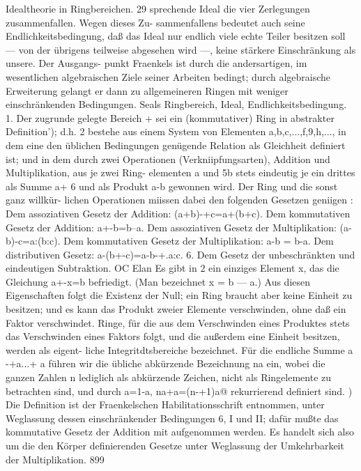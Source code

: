 \documentclass[11pt,a4paper]{article}
\theoremstyle{plain}
\theoremstyle{definition}
\begin{document}
Idealtheorie in Ringbereichen. 
29 
sprechende Ideal die vier Zerlegungen zusammenfallen. 
Wegen dieses Zu- 
sammenfallens bedeutet auch seine Endlichkeitsbedingung, daß das Ideal 
nur endlich viele echte Teiler besitzen soll --- 
von der übrigens teilweise 
abgesehen wird ---, keine stärkere Einschränkung als unsere. 
Der Ausgangs- 
punkt Fraenkels ist durch die andersartigen, im wesentlichen algebraischen 
Ziele seiner Arbeiten bedingt; durch algebraische Erweiterung gelangt er 
dann zu allgemeineren Ringen mit weniger einschränkenden Bedingungen. 
Seals 
Ringbereich, Ideal, Endlichkeitsbedingung. 
1. Der zugrunde gelegte Bereich + sei ein (kommutativer) Ring in 
abstrakter Definition'); d.h. 2 bestehe aus einem System von Elementen 
a,b,c,...,f,9,h,..., 
in dem eine den üblichen Bedingungen genügende 
Relation als Gleichheit definiert ist; und in dem durch zwei Operationen 
(Verkniipfungsarten), 
Addition 
und Multiplikation, 
aus 
je zwei Ring- 
elementen a und 5b stets eindeutig je ein drittes 
als Summe a+ 6 und 
als Produkt a-b gewonnen wird. 
Der Ring und die sonst ganz willkür- 
lichen Operationen miissen dabei den folgenden Gesetzen geniigen : 
Dem assoziativen Gesetz der Addition: (a+b)-+c=a+(b+c). 
Dem kommutativen Gesetz der Addition: 
a+-b=b--a. 
Dem assoziativen Gesetz der Multiplikation: 
(a-b)-c=a:(b:c). 
Dem kommutativen Gesetz der Multiplikation: a-b = b-a. 
Dem distributiven Gesetz: a-(b+-c)=a-b-+.a:c. 
6. Dem Gesetz der unbeschränkten und eindeutigen Subtraktion. 
OC 
Elan 
Es gibt in 2 ein einziges Element 
x, 
das die 
Gleichung a+-x=b 
befriedigt. 
(Man bezeichnet x = b --- a.) 
Aus diesen Eigenschaften 
folgt die Existenz 
der Null; 
ein Ring 
braucht aber keine Einheit zu besitzen; und es kann das Produkt zweier 
Elemente verschwinden, 
ohne daß 
ein Faktor verschwindet. 
Ringe, 
für 
die aus dem Verschwinden eines Produktes 
stets das Verschwinden eines 
Faktors folgt, und die außerdem eine Einheit besitzen, werden als eigent- 
liche Integritdtsbereiche bezeichnet. 
Für die endliche Summe a -+a...+ a 
führen wir die übliche abkürzende Bezeichnung na ein, wobei die ganzen 
Zahlen n lediglich 
als abkürzende Zeichen, 
nicht 
als Ringelemente 
zu 
betrachten 
sind, und durch 
a=1-a, na+a=(n-+1)a@ 
rekurrierend 
definiert sind. 
\textdegree{}) Die Definition 
ist der Fraenkelschen Habilitationsschrift entnommen, 
unter 
Weglassung 
dessen einschränkender 
Bedingungen 
6, I und 
II; dafür mußte 
das 
kommutative Gesetz der Addition 
mit aufgenommen werden. 
Es handelt 
sich also 
um die den Körper definierenden Gesetze unter Weglassung der Umkehrbarkeit der 
Multiplikation. 
899
\end{document}
